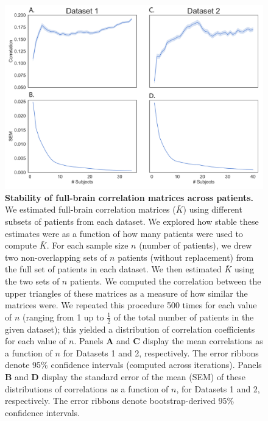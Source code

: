 \documentclass[11pt]{article}
\begin{document}
\begin{figure}[p]
\centering \includegraphics[width=\textwidth]{figs/supplemental_8}
\caption{\textbf{Stability of full-brain correlation matrices across
    patients.}  We estimated full-brain correlation matrices
  ($\bar{K}$) using different subsets of patients from each
  dataset. We explored how stable these estimates were as a function
  of how many patients were used to compute $\bar{K}$. For each sample
  size $n$ (number of patients), we drew two non-overlapping sets of
  $n$ patients (without replacement) from the full set of patients in
  each dataset. We then estimated $\bar{K}$ using the two sets of $n$
  patients.  We computed the correlation between the upper triangles
  of these matrices as a measure of how similar the matrices were.  We
  repeated this procedure 500 times for each value of $n$ (ranging
  from 1 up to $\frac{1}{2}$ of the total number of patients in the
  given dataset); this yielded a distribution of correlation
  coefficients for each value of $n$.  Panels \textbf{A} and
  \textbf{C} display the mean correlations as a function of $n$ for
  Datasets 1 and 2, respectively.  The error ribbons denote 95\%
  confidence intervals (computed across iterations).  Panels
  \textbf{B} and \textbf{D} display the standard error of the mean
  (SEM) of these distributions of correlations as a function of $n$,
  for Datasets 1 and 2, respectively.  The error ribbons denote
  bootstrap-derived 95\% confidence intervals.}
\label{fig:supplemental_8}
\end{figure}

\clearpage
\newpage
\renewcommand{\refname}{Supplemental references}
\renewcommand{\bibnumfmt}[1]{[S#1]}
\renewcommand{\citenumfont}[1]{S#1}



% 
\end{document}

